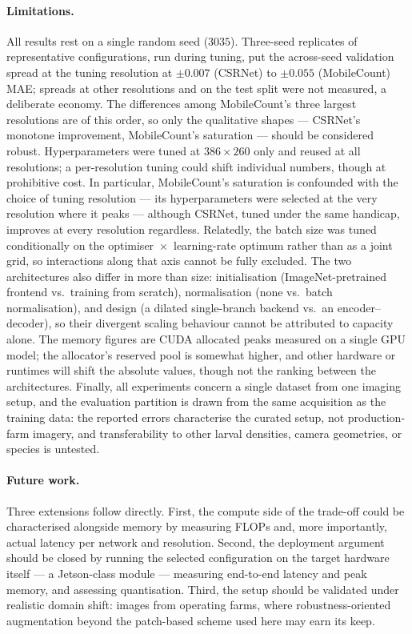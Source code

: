 \paragraph{Limitations.}
All results rest on a single random seed ($3035$). Three-seed
replicates of representative configurations, run during tuning, put
the across-seed validation spread at the tuning resolution at
$\pm0.007$ (CSRNet) to $\pm0.055$ (MobileCount) MAE; spreads at other
resolutions and on the test split were not measured, a deliberate
economy. The differences among MobileCount's three largest resolutions
are of this order, so only the qualitative shapes — CSRNet's monotone
improvement, MobileCount's saturation — should be considered robust.
Hyperparameters were tuned at $386\times260$ only and reused at all
resolutions; a per-resolution tuning could shift individual numbers,
though at prohibitive cost. In particular, MobileCount's saturation is
confounded with the choice of tuning resolution — its hyperparameters
were selected at the very resolution where it peaks — although CSRNet,
tuned under the same handicap, improves at every resolution
regardless. Relatedly, the batch size was tuned conditionally on the
optimiser~$\times$~learning-rate optimum rather than as a joint grid,
so interactions along that axis cannot be fully excluded. The two
architectures also differ in more than size: initialisation
(ImageNet-pretrained frontend vs.\ training from scratch),
normalisation (none vs.\ batch normalisation), and design (a dilated
single-branch backend vs.\ an encoder--decoder), so their divergent
scaling behaviour cannot be attributed to capacity alone. The memory
figures are CUDA allocated peaks measured on a single GPU model; the
allocator's reserved pool is somewhat higher, and other hardware or
runtimes will shift the absolute values, though not the ranking
between the architectures. Finally, all experiments concern a single
dataset from one imaging setup, and the evaluation partition is drawn
from the same acquisition as the training data: the reported errors
characterise the curated setup, not production-farm imagery, and
transferability to other larval densities, camera geometries, or
species is untested.

\paragraph{Future work.}
Three extensions follow directly. First, the compute side of the
trade-off could be characterised alongside memory by measuring FLOPs
and, more importantly, actual latency per network and resolution.
Second, the deployment argument should be closed by running the
selected configuration on the target hardware itself — a Jetson-class
module — measuring end-to-end latency and peak memory, and assessing
quantisation. Third, the setup should be validated under realistic
domain shift: images from operating farms, where robustness-oriented
augmentation beyond the patch-based scheme used here may earn its
keep.
